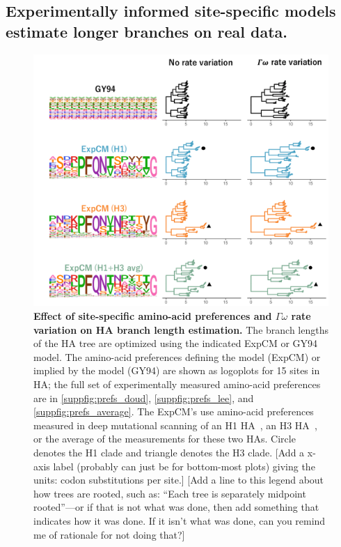 \documentclass[11pt]{article}
\newcommand\jdbcomment[1]{{\color{red}[#1]}}
\begin{document}
\subsection*{Experimentally informed site-specific models estimate longer branches on real data.}

\begin{figure}
\centerline{\includegraphics[width=\textwidth]{figures/empirical_trees.pdf}}
\caption{\label{fig:empirical_trees}
\textbf{Effect of site-specific amino-acid preferences and $\Gamma\omega$ rate variation on HA branch length estimation.} 
The branch lengths of the HA tree are optimized using the indicated ExpCM or GY94 model. 
The amino-acid preferences defining the model (ExpCM) or implied by the model (GY94) are shown as logoplots for 15 sites in HA; the full set of experimentally measured amino-acid preferences are in \ref{suppfig:prefs_doud}, \ref{suppfig:prefs_lee}, and \ref{suppfig:prefs_average}. 
The ExpCM's use amino-acid preferences measured in deep mutational scanning of an H1 HA~\citep{doud2016accurate}, an H3 HA~\citep{lee2018deep}, or the average of the measurements for these two HAs.
Circle denotes the H1 clade and triangle denotes the H3 clade.
\jdbcomment{Add a x-axis label (probably can just be for bottom-most plots) giving the units: codon substitutions per site.} 
\jdbcomment{Add a line to this legend about how trees are rooted, such as: ``Each tree is separately midpoint rooted''---or if that is not what was done, then add something that indicates how it was done. If it isn't what was done, can you remind me of rationale for not doing that?}
}
\end{figure}
\end{document}
